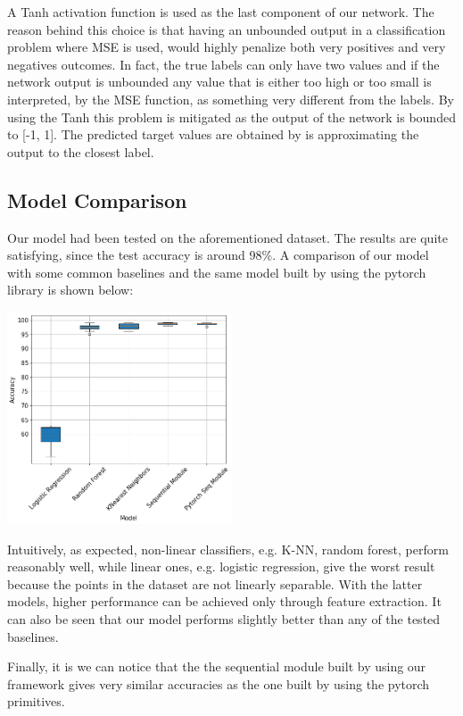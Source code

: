 \documentclass[10pt,conference,compsocconf]{IEEEtran}
\begin{document}
A Tanh activation function is used as the last component of our network. The reason behind this choice is that having an unbounded output in a classification problem where MSE is used, would highly penalize both very positives and very negatives outcomes. In fact, the true labels can only have two values and if the network output is unbounded any value that is either too high or too small is interpreted, by the MSE function, as something very different from the labels. By using the Tanh this problem is mitigated as the output of the network is bounded to [-1, 1]. The predicted target values are obtained by is approximating the output to the closest label.

\subsection{Model Comparison}
Our model had been tested on the aforementioned dataset. The results are quite satisfying, since the test accuracy is around 98\%.
A comparison of our model with some common baselines and the same model built by using the pytorch library is shown below:
\begin{center}
	\captionsetup{type=figure}
	\includegraphics[width=0.5\textwidth]{img/boxplots_final.png}
	\label{fig:boxplot}
\end{center} 
Intuitively, as expected, non-linear classifiers, e.g. K-NN, random forest, perform reasonably well, while linear ones, e.g. logistic regression, give the worst result because the points in the dataset are not linearly separable. With the latter models, higher performance can be achieved only through feature extraction. It can also be seen that our model performs slightly better than any of the tested baselines.

Finally, it is we can notice that the the sequential module built by using our framework gives very similar accuracies as the one built by using the pytorch primitives.
\end{document}

